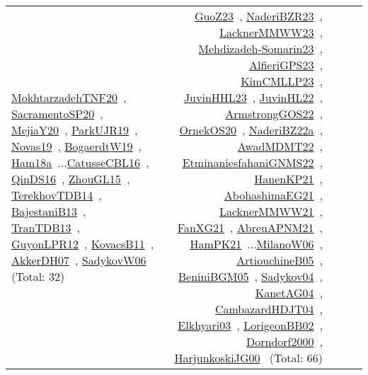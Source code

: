 {\begin{longtable}{p{3cm}r>{\raggedright\arraybackslash}p{6cm}>{\raggedright\arraybackslash}p{6cm}>{\raggedright\arraybackslash}p{8cm}}
\href{../works/MokhtarzadehTNF20.pdf}{MokhtarzadehTNF20}~\cite{MokhtarzadehTNF20}, \href{../works/SacramentoSP20.pdf}{SacramentoSP20}~\cite{SacramentoSP20}, \href{../works/MejiaY20.pdf}{MejiaY20}~\cite{MejiaY20}, \href{../works/ParkUJR19.pdf}{ParkUJR19}~\cite{ParkUJR19}, \href{../works/Novas19.pdf}{Novas19}~\cite{Novas19}, \href{../works/BogaerdtW19.pdf}{BogaerdtW19}~\cite{BogaerdtW19}, \href{../works/Ham18a.pdf}{Ham18a}~\cite{Ham18a}...\href{../works/CatusseCBL16.pdf}{CatusseCBL16}~\cite{CatusseCBL16}, \href{../works/QinDS16.pdf}{QinDS16}~\cite{QinDS16}, \href{../works/ZhouGL15.pdf}{ZhouGL15}~\cite{ZhouGL15}, \href{../works/TerekhovTDB14.pdf}{TerekhovTDB14}~\cite{TerekhovTDB14}, \href{../works/BajestaniB13.pdf}{BajestaniB13}~\cite{BajestaniB13}, \href{../works/TranTDB13.pdf}{TranTDB13}~\cite{TranTDB13}, \href{../works/GuyonLPR12.pdf}{GuyonLPR12}~\cite{GuyonLPR12}, \href{../works/KovacsB11.pdf}{KovacsB11}~\cite{KovacsB11}, \href{../works/AkkerDH07.pdf}{AkkerDH07}~\cite{AkkerDH07}, \href{../works/SadykovW06.pdf}{SadykovW06}~\cite{SadykovW06} (Total: 32) & \href{../works/GuoZ23.pdf}{GuoZ23}~\cite{GuoZ23}, \href{../works/NaderiBZR23.pdf}{NaderiBZR23}~\cite{NaderiBZR23}, \href{../works/LacknerMMWW23.pdf}{LacknerMMWW23}~\cite{LacknerMMWW23}, \href{../works/Mehdizadeh-Somarin23.pdf}{Mehdizadeh-Somarin23}~\cite{Mehdizadeh-Somarin23}, \href{../works/AlfieriGPS23.pdf}{AlfieriGPS23}~\cite{AlfieriGPS23}, \href{../works/KimCMLLP23.pdf}{KimCMLLP23}~\cite{KimCMLLP23}, \href{../works/JuvinHHL23.pdf}{JuvinHHL23}~\cite{JuvinHHL23}, \href{../works/JuvinHL22.pdf}{JuvinHL22}~\cite{JuvinHL22}, \href{../works/ArmstrongGOS22.pdf}{ArmstrongGOS22}~\cite{ArmstrongGOS22}, \href{../works/OrnekOS20.pdf}{OrnekOS20}~\cite{OrnekOS20}, \href{../works/NaderiBZ22a.pdf}{NaderiBZ22a}~\cite{NaderiBZ22a}, \href{../works/AwadMDMT22.pdf}{AwadMDMT22}~\cite{AwadMDMT22}, \href{../works/EtminaniesfahaniGNMS22.pdf}{EtminaniesfahaniGNMS22}~\cite{EtminaniesfahaniGNMS22}, \href{../works/HanenKP21.pdf}{HanenKP21}~\cite{HanenKP21}, \href{../works/AbohashimaEG21.pdf}{AbohashimaEG21}~\cite{AbohashimaEG21}, \href{../works/LacknerMMWW21.pdf}{LacknerMMWW21}~\cite{LacknerMMWW21}, \href{../works/FanXG21.pdf}{FanXG21}~\cite{FanXG21}, \href{../works/AbreuAPNM21.pdf}{AbreuAPNM21}~\cite{AbreuAPNM21}, \href{../works/HamPK21.pdf}{HamPK21}~\cite{HamPK21}...\href{../works/MilanoW06.pdf}{MilanoW06}~\cite{MilanoW06}, \href{../works/ArtiouchineB05.pdf}{ArtiouchineB05}~\cite{ArtiouchineB05}, \href{../works/BeniniBGM05.pdf}{BeniniBGM05}~\cite{BeniniBGM05}, \href{../works/Sadykov04.pdf}{Sadykov04}~\cite{Sadykov04}, \href{../works/KanetAG04.pdf}{KanetAG04}~\cite{KanetAG04}, \href{../works/CambazardHDJT04.pdf}{CambazardHDJT04}~\cite{CambazardHDJT04}, \href{../works/Elkhyari03.pdf}{Elkhyari03}~\cite{Elkhyari03}, \href{../works/LorigeonBB02.pdf}{LorigeonBB02}~\cite{LorigeonBB02}, \href{../works/Dorndorf2000.pdf}{Dorndorf2000}~\cite{Dorndorf2000}, \href{../works/HarjunkoskiJG00.pdf}{HarjunkoskiJG00}~\cite{HarjunkoskiJG00} (Total: 66)\\

\end{longtable}}
